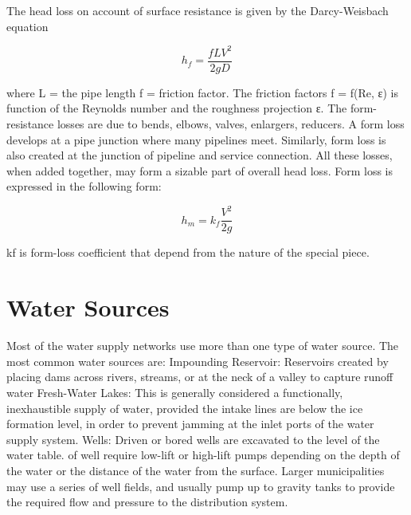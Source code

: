 The head loss on account of surface resistance is given by the Darcy-Weisbach equation

\begin{equation}
    h_{f}=\frac{fLV^{2}}{2gD}
\end{equation}

where L = the pipe length
f = friction factor.
The friction factors f = f(Re, ε) is function of the Reynolds number and the roughness projection ε.
The form-resistance losses are due to bends, elbows, valves, enlargers, reducers. A form loss 
develops at a pipe junction where many pipelines meet. Similarly, form loss is also created at 
the junction of pipeline and service connection. All these losses, when added together, may form
a sizable part of overall head loss.
Form loss is expressed in the following form:


\begin{equation}
    h_{m}=k_{f}\frac{V^2}{2g}
\end{equation}

kf  is form-loss coefficient that depend from the nature of the special piece.

\section{Water Sources}

Most of the water supply networks use more than one type of water source. The most common water 
sources are: 
\bigbreak
Impounding Reservoir: Reservoirs created by placing dams across rivers, streams, 
or at the neck of a valley to capture runoff water 
\bigbreak
Fresh-Water Lakes: This is generally considered a functionally, inexhaustible supply of water,
provided the intake lines are below the ice formation level, in order to prevent jamming at the 
inlet ports of the water supply system.
\bigbreak
Wells: Driven or bored wells are excavated to the level of the water table. of well require 
low-lift or high-lift pumps depending on the depth of the water or the distance of the water 
from the surface. Larger municipalities may use a series of well fields, and usually pump up to 
gravity tanks to provide the required flow and pressure to the distribution system.

